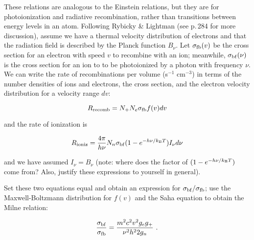 \begin{enumerate}
      These relations are analogous to the Einstein relations, but they are for photoionization and radiative recombination, rather than transitions between energy levels in an atom. Following Rybicky \& Lightman (see p.\,284 for more discussion), assume we have a thermal velocity distribution of electrons and that the radiation field is described by the Planck function $B_\nu$. Let $\sigma_{\rm fb}(v)$ be the cross section for an electron with speed $v$ to recombine with an ion; meanwhile, $\sigma_{\rm bf}(\nu)$ is the cross section for an ion to to be photoionized by a photon with frequency $\nu$. We can write the rate of recombinations per volume (s$^{-1}$ cm$^{-3}$) in terms of the number densities of ions and electrons, the cross section, and the electron velocity distribution for a velocity range $dv$:
      
      \begin{equation}
      R_{\rm recomb} = N_+N_e \sigma_{\rm fb} f(v) dv
      \end{equation}
      
      and the rate of ionization is
      
       \begin{equation}
      R_{\rm ioniz} = \frac{4\pi}{h\nu} N_n \sigma_{\rm bf} (1 - e^{-h\nu/k_{\rm B}T}) I_\nu d\nu
      \end{equation}
      
      and we have assumed $I_\nu = B_\nu$ (note: where does the factor of $(1 - e^{-h\nu/k_{\rm B}T})$ come from? Also, justify these expressions to yourself in general).
      
      Set these two equations equal and obtain an expression for $\sigma_{\rm bf} / \sigma_{\rm fb}$; use the Maxwell-Boltzmann distribution for $f(v)$ and the Saha equation to obtain the Milne relation:
      
      \begin{equation}
      \frac{\sigma_{\rm bf}}{\sigma_{\rm fb}} = \frac{m^2 c^2 v^2 g_e g_+}{\nu^2 h^2 2 g_n}\,\, .
      \end{equation}
      

\end{enumerate}
